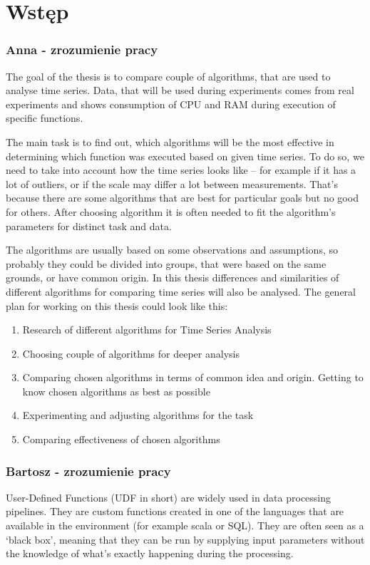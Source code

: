 
\chapter{Wstęp}

\subsection{Anna - zrozumienie pracy}
The goal of the thesis is to compare couple of algorithms, that are used to analyse time series.
Data, that will be used during experiments comes from real experiments and shows consumption of CPU and RAM during execution of specific functions. 
\par
The main task is to find out, which algorithms will be the most effective in determining which function was executed based on given time series. To do so, we need to take into account how the time series looks like – for example if it has a lot of outliers, or if the scale may differ a lot between measurements. That’s because there are some algorithms that are best for particular goals but no good for others. After choosing algorithm it is often needed to fit the algorithm’s
parameters for distinct task and data.
\par 
The algorithms are usually based on some observations and assumptions, so probably they could be divided into groups, that were based on the same grounds, or have common origin. In this thesis differences and similarities of different algorithms for comparing time series will also be analysed.
The general plan for working on this thesis could look like this:
\begin{enumerate}
\item Research of different algorithms for Time Series Analysis
\item Choosing couple of algorithms for deeper analysis
\item Comparing chosen algorithms in terms of common idea and origin. Getting to know chosen algorithms as best as possible
\item Experimenting and adjusting algorithms for the task
\item Comparing effectiveness of chosen algorithms
\end{enumerate}
\newpage
\subsection{Bartosz - zrozumienie pracy}
User-Defined Functions (UDF in short) are widely used in data processing pipelines. They are custom functions created in one of the languages that are available in the environment (for example scala or SQL). They are often seen as a ‘black box’, meaning that they can be run by supplying input parameters without the knowledge of what’s exactly happening during the processing. 

